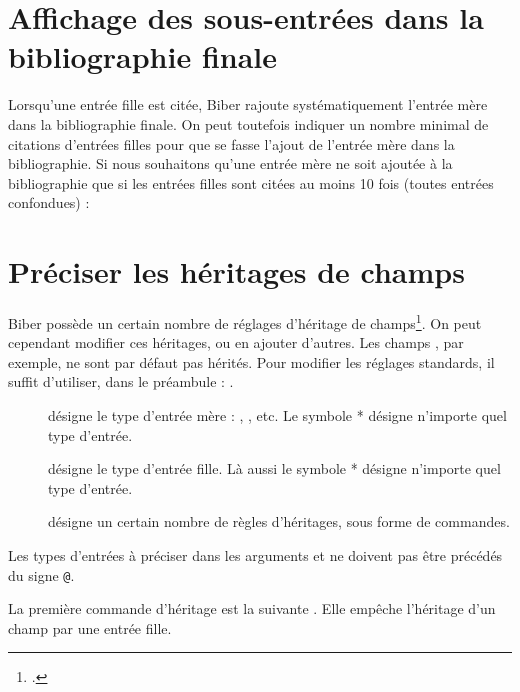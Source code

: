 \section{Affichage des sous-entrées dans la bibliographie finale}


Lorsqu'une entrée fille est citée, Biber rajoute systématiquement l'entrée mère dans la bibliographie finale. On peut toutefois indiquer un nombre minimal de citations d'entrées filles pour que se fasse l'ajout de l'entrée mère dans la bibliographie. Si nous souhaitons qu'une entrée mère ne soit ajoutée à la bibliographie que si les entrées filles sont citées au moins 10 fois (toutes entrées confondues) :


\begin{latexcode}
\usepackage[mincrossrefs=10,…]{biblatex}
\end{latexcode}





\section{Préciser les héritages de champs}

Biber possède un certain nombre de réglages d'héritage de champs\footcite{biblatex_crossrefsetup}. On peut cependant modifier ces héritages, ou en ajouter d'autres. Les champs , par exemple, ne sont par défaut pas hérités. 
Pour modifier les réglages standards, il suffit d'utiliser, dans le préambule  :
.

\begin{description}
\item[] désigne le type d'entrée mère : , , etc. Le symbole * désigne n'importe quel type d'entrée.
\item[] désigne le type d'entrée fille. Là aussi le symbole * désigne n'importe quel type d'entrée.
\item[] désigne un certain nombre de règles d'héritages, sous forme de commandes.
\end{description}

Les types d'entrées à préciser dans les arguments  et  ne doivent pas être précédés du signe \verb|@|.

La première commande d'héritage est la suivante .
Elle empêche l'héritage d'un champ par une entrée fille.


